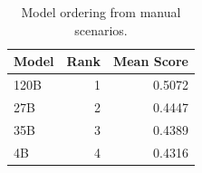 \begin{table}[htbp]
\centering
\caption{Model ordering from manual scenarios.}
\label{tab:model-ordering}
\begin{tabular}{lrr}
\toprule
Model & Rank & Mean Score \\
\midrule
120B & 1 & 0.5072 \\
27B & 2 & 0.4447 \\
35B & 3 & 0.4389 \\
4B & 4 & 0.4316 \\
\bottomrule
\end{tabular}
\end{table}
